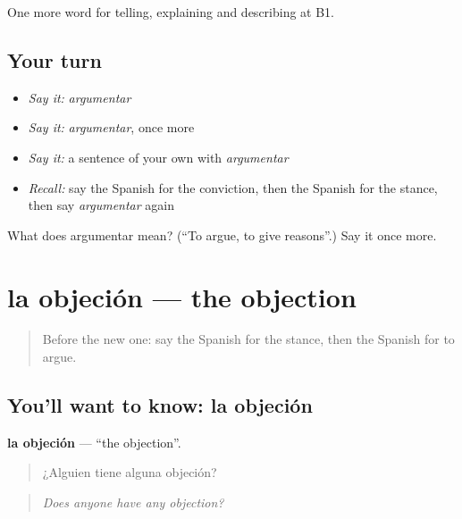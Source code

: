 \begin{grammarlens}[title={What you've built}]
One more word for telling, explaining and describing at B1.
\end{grammarlens}

\subsection*{Your turn}
\begin{itemize}
\raggedright
  \item \emph{Say it:} \emph{argumentar}
  \item \emph{Say it:} \emph{argumentar}, once more
  \item \emph{Say it:} a sentence of your own with \emph{argumentar}
  \item \emph{Recall:} say the Spanish for the conviction, then the Spanish for the stance, then say \emph{argumentar} again
\end{itemize}

\begin{tcolorbox}[breakable,colback=teal!4,colframe=teal!35!black,title={Before you move on}]
What does argumentar mean? (\textquotedblleft{}To argue, to give reasons\textquotedblright{}.) Say it once more.
\end{tcolorbox}
\section[la objeción]{la objeción — the objection}

\label{lesson:ES-C577-objecion}



\begin{quote}
Before the new one: say the Spanish for the stance, then the Spanish for to argue.
\end{quote}

\subsection*{You'll want to know: la objeción}
\textbf{la objeción} — \textquotedblleft{}the objection\textquotedblright{}.

\begin{quote}
¿Alguien tiene alguna objeción?
\end{quote}

\begin{quote}
\emph{Does anyone have any objection?}
\end{quote}

